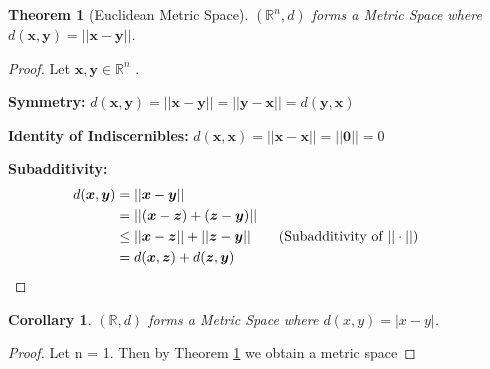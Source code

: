 \documentclass{article}
\newtheorem{theorem}{Theorem}[section]
\newtheorem{corollary}{Corollary}[theorem]
\begin{document}
			\begin{theorem}[Euclidean Metric Space]
			\label{euclidean metric space}
			$(\mathbb{R}^n, d)$ forms a Metric Space where $d(\bm{x}, \bm{y}) = ||\bm{x} - \bm{y}||$.
			\end{theorem}
			\begin{proof}
				Let $\bm{x}, \bm{y} \in \mathbb{R}^n$ .
				\item \textbf{Symmetry:} $d(\bm{x},\bm{y}) = ||\bm{x}-\bm{y}|| = ||\bm{y}-\bm{x}|| = d(\bm{y},\bm{x})$
				\item \textbf{Identity of Indiscernibles:} $d(\bm{x},\bm{x}) = ||\bm{x}-\bm{x}|| = ||\bm{0}|| = 0$
				\item \textbf{Subadditivity:}
				\begin{align*}
					d(\bm{x},\bm{y}) &= ||\bm{x}-\bm{y}||\\
									 &= ||(\bm{x}-\bm{z}) + (\bm{z}-\bm{y})||\\
									 &\leq ||\bm{x}-\bm{z}|| + ||\bm{z}-\bm{y}|| \tag{Subadditivity of $||\cdot||$}\\
									 &= d(\bm{x},\bm{z}) + d(\bm{z},\bm{y}) &&\qedhere
				\end{align*}
			\end{proof}

			\begin{corollary}
				$(\mathbb{R}, d)$ forms a Metric Space where $d(x, y) = |x - y|$.
			\end{corollary}
			\begin{proof}
				Let n = 1. Then by Theorem \ref{euclidean metric space} we obtain a metric space
			\end{proof}
\end{document}
